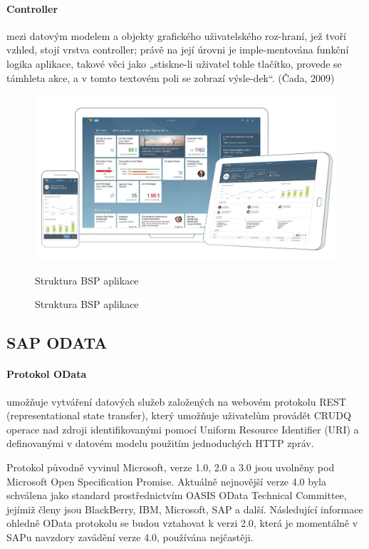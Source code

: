 \documentclass[thesis=M,czech]{FITthesis}[2012/06/26]
\begin{document}
\paragraph{Controller} mezi datovým modelem a objekty grafického uživatelského roz-hraní, jež tvoří vzhled, stojí vrstva controller; právě na její úrovni je imple-mentována funkční logika aplikace, takové věci jako „stiskne-li uživatel tohle tlačítko, provede se támhleta akce, a v tomto textovém poli se zobrazí výsle-dek“. (Čada, 2009)

\begin{figure}[H]
	\centering
	\includegraphics[width=1\textwidth]{images/fiori.jpg}
	\caption{Struktura BSP aplikace}
	\label{img:fiori}
	\small
	Struktura BSP aplikace
\end{figure}

\subsection{SAP ODATA}

\paragraph{Protokol OData} umožňuje vytváření datových služeb založených na webovém protokolu REST (representational state transfer), který umožňuje uživatelům provádět CRUDQ operace nad zdroji identifikovanými pomocí Uniform Resource Identifier (URI) a definovanými v datovém modelu použitím jednoduchých HTTP zpráv.

Protokol původně vyvinul Microsoft, verze 1.0, 2.0 a 3.0 jsou uvolněny pod Microsoft Open Specification Promise. Aktuálně nejnovější verze 4.0 byla schválena jako standard prostřednictvím OASIS OData Technical Committee, jejímiž členy jsou BlackBerry, IBM, Microsoft, SAP a další. Následující informace ohledně OData protokolu se budou vztahovat k verzi 2.0, která je momentálně v SAPu navzdory zavádění verze 4.0, používána nejčastěji. 
\end{document}
